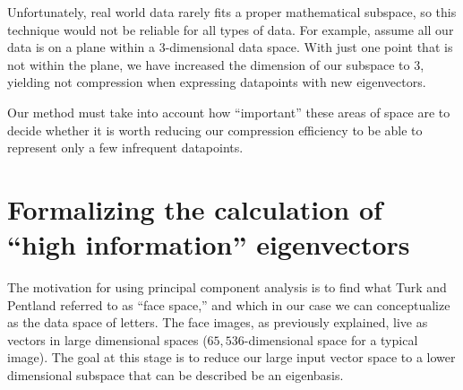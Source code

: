 \documentclass[12pt]{report}
\begin{document}
            Unfortunately, real world data rarely fits a proper mathematical subspace, so this technique would not be reliable for all types of data. For example, assume all our data is on a plane within a 3-dimensional data space. With just one point that is not within the plane, we have increased the dimension of our subspace to 3, yielding not compression when expressing datapoints with new eigenvectors.
            
            Our method must take into account how ``important'' these areas of space are to decide whether it is worth reducing our compression efficiency to be able to represent only a few infrequent datapoints.
                
        
        \section{Formalizing the calculation of ``high information'' eigenvectors}
            The motivation for using principal component analysis is to find what Turk and Pentland referred to as ``face space,'' and which in our case we can conceptualize as the data space of letters. The face images, as previously explained, live as vectors in large dimensional spaces ($65,536$-dimensional  space for a typical image). The goal at this stage is to reduce our large input vector space to a lower dimensional subspace that can be described be an eigenbasis.  
    

    
\end{document}
